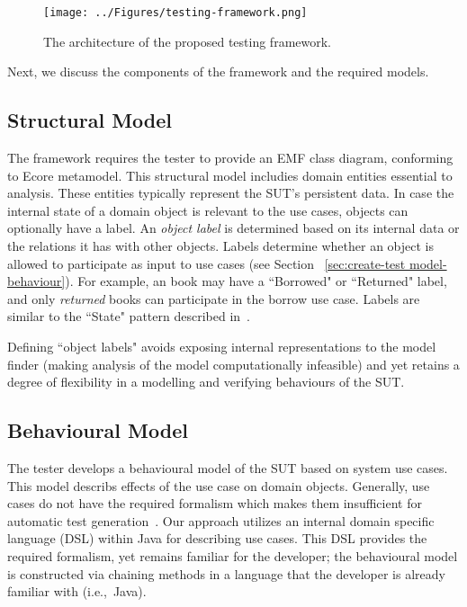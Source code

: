 \begin{figure*}[ht]
\centering
\texttt{[image: ../Figures/testing-framework.png]}
\caption{The architecture of the proposed testing framework.}
\label{fig:testing-framework}
\end{figure*}

Next, we discuss the components of the framework and the required models. 

\subsection{Structural Model}
\label{sec:framework-overview-structure}
The framework requires the tester to provide an EMF class diagram, conforming to Ecore metamodel.
This structural model includies domain entities essential to analysis. These entities typically represent the SUT's persistent data. 
In case the internal state of a domain object is relevant to the use cases, objects can optionally have a label.
An \textit{object label} is determined based on its internal data or the relations it has with other objects.
Labels determine whether an object is allowed to participate as input to use cases (see Section ~\ref{sec:create-test model-behaviour}). For example, an book may have a ``Borrowed" or ``Returned" label, and only \textit{returned} books can participate in the borrow  use case. Labels are similar to the ``State" pattern described in~\cite{Gamma1995}. 

Defining ``object labels" avoids exposing internal representations to the model finder (making analysis of the model computationally infeasible) and yet retains a degree of flexibility in a modelling and verifying behaviours of the SUT.

\subsection{Behavioural Model}
\label{sec:framework-overview-behaviour}
The tester develops a behavioural model of the SUT based on system use cases. This model describs effects of the use case on domain objects. Generally, use cases do not have the required formalism which makes them insufficient for automatic test generation~\cite{Beck2000}. Our approach utilizes an internal domain specific language (DSL) within Java for describing use cases. This DSL provides the required formalism, yet remains familiar for the developer;  the behavioural model is constructed via chaining methods in a language that the developer is already familiar with (i.e.,\ Java).

